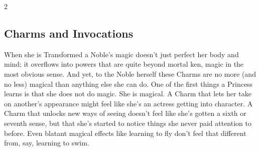 \begin{multicols}{2}

\subsection*{Charms and Invocations}

When she is Transformed a Noble's magic doesn't just perfect her body and mind; it overflows into powers that are quite beyond mortal ken, magic in the most obvious sense. And yet, to the Noble herself these Charms are no more (and no less) magical than anything else she can do. One of the first things a Princess learns is that she does not do magic. She is magical. A Charm that lets her take on another's appearance might feel like she's an actress getting into character. A Charm that unlocks new ways of seeing doesn't feel like she's gotten a sixth or seventh sense, but that she's started to notice things she never paid attention to before. Even blatant magical effects like learning to fly don't feel that different from, say, learning to swim.


\end{multicols}
